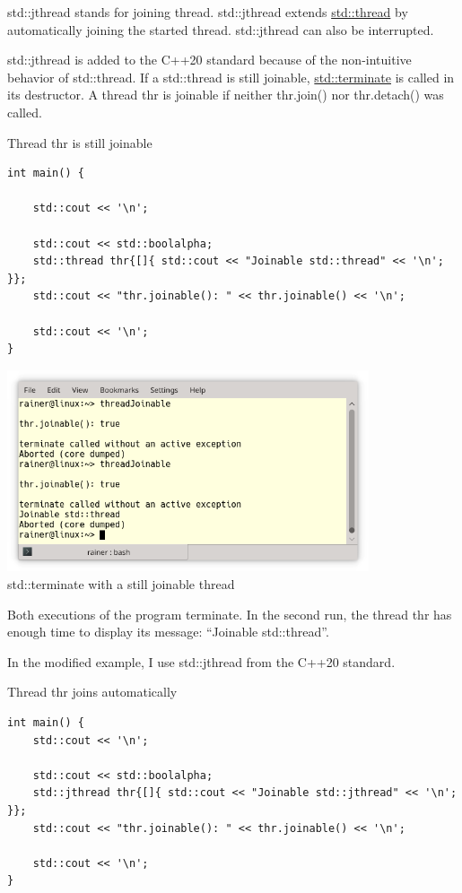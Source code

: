 
std::jthread stands for joining thread. std::jthread extends \href{https://en.cppreference.com/w/cpp/thread/thread}{std::thread} by automatically joining the started thread. std::jthread can also be interrupted.

std::jthread is added to the C++20 standard because of the non-intuitive behavior of std::thread. If a std::thread is still joinable, \href{https://en.cppreference.com/w/cpp/error/terminate}{std::terminate} is called in its destructor. A thread thr is joinable if neither thr.join() nor thr.detach() was called.

\noindent
Thread thr is still joinable
\begin{lstlisting}[style=styleCXX]
int main() {
	
	std::cout << '\n';
	
	std::cout << std::boolalpha;
	std::thread thr{[]{ std::cout << "Joinable std::thread" << '\n'; }};
	std::cout << "thr.joinable(): " << thr.joinable() << '\n';
	
	std::cout << '\n';
}
\end{lstlisting}

\begin{center}
\includegraphics[width=0.8\textwidth]{content/2/chapter3/images/9.png}\\
std::terminate with a still joinable thread
\end{center}

Both executions of the program terminate. In the second run, the thread thr has enough time to display its message: “Joinable std::thread”.

In the modified example, I use std::jthread from the C++20 standard.

\noindent
Thread thr joins automatically
\begin{lstlisting}[style=styleCXX]
int main() {
	std::cout << '\n';
	
	std::cout << std::boolalpha;
	std::jthread thr{[]{ std::cout << "Joinable std::jthread" << '\n'; }};
	std::cout << "thr.joinable(): " << thr.joinable() << '\n';
	
	std::cout << '\n';
}
\end{lstlisting}

